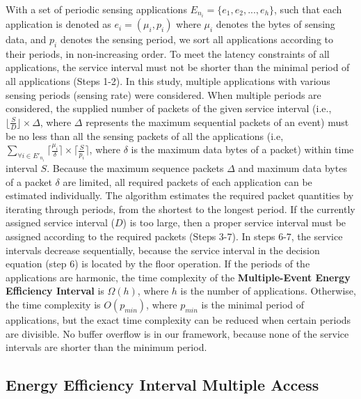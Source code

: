 \documentclass[10pt,journal,compsoc]{IEEEtran}
\begin{document}
With a set of periodic sensing applications $E_{n_i}=\{e_1, e_2,..., e_h\}$, such that each application is denoted as $e_i=(\mu_i, p_i)$ where $\mu_i$ denotes the bytes of sensing data, and $p_i$ denotes the sensing period, we sort all applications according to their periods, in non-increasing order. To meet the latency constraints of all applications, the service interval must not be shorter than the minimal period of all applications (Steps 1-2). In this study, multiple applications with various sensing periods (sensing rate) were considered. When multiple periods are considered, the supplied number of packets of the given service interval (i.e., ${\lfloor{\frac{S}{D}}\rfloor} \times {\Delta}$, where $\Delta$ represents the maximum sequential packets of an event) must be no less than all the sensing packets of all the applications (i.e, $\sum_{\forall i \in E'_{n_i}} \lceil{\frac{\mu_i}{\delta}}\rceil \times {\lceil{\frac{S}{p_i}}\rceil}$, where $\delta$ is the maximum data bytes of a packet) within time interval $S$. Because the maximum sequence packets $\Delta$ and maximum data bytes of a packet $\delta$ are limited, all required packets of each application can be estimated individually. The algorithm estimates the required packet quantities by iterating through periods, from the shortest to the longest period. If the currently assigned service interval ($D$) is too large, then a proper service interval must be assigned according to the required packets (Steps 3-7). In steps 6-7, the service intervals decrease sequentially, because the service interval in the decision equation (step 6) is located by the floor operation. If the periods of the applications are harmonic, the time complexity of the {\bf Multiple-Event Energy Efficiency Interval} is $\Omega({h})$, where $h$ is the number of applications. Otherwise, the time complexity is $O(p_{min})$, where $p_{min}$ is the minimal period of applications, but the exact time complexity can be reduced when certain periods are divisible. No buffer overflow is in our framework, because none of the service intervals are shorter than the minimum period.


\subsection{Energy Efficiency Interval Multiple Access}\label{sec:EIMA}
\end{document}
